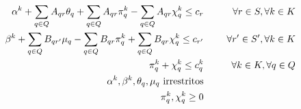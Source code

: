 \documentclass[12pt]{article}
\begin{document}
\begin{small}
\begin{eqnarray}
\label{eqC01}
  \alpha^k + \sum\limits_{q \in Q}{A_{qr} \theta_q} + \sum\limits_{q \in Q}{A_{qr} \pi^k_q} - \sum\limits_{q \in Q}{A_{qr} \chi^k_q} \le c_r & \hspace{5mm} & \forall r \in S, \forall k \in K \\
\label{eqC02}
  \beta^k + \sum\limits_{q \in Q}{B_{qr'} \mu_q} - \sum\limits_{q \in Q}{B_{qr} \pi^k_q} + \sum\limits_{q \in Q}{B_{qr} \chi^k_q} \le c_{r'} & \hspace{5mm} & \forall r' \in S', \forall k \in K \\
\label{eqC03}  
  \pi^k_q + \chi^k_q \le c^k_q & \hspace{5mm} & \forall k \in K, \forall q \in Q \\
\label{eqC04}
  \alpha^k, \beta^k, \theta_q, \mu_q \textrm{  irrestritos}  \\
\label{eqC05}
  \pi^k_q, \chi^k_q \ge 0
\end{eqnarray}
\end{small}
\end{document}
